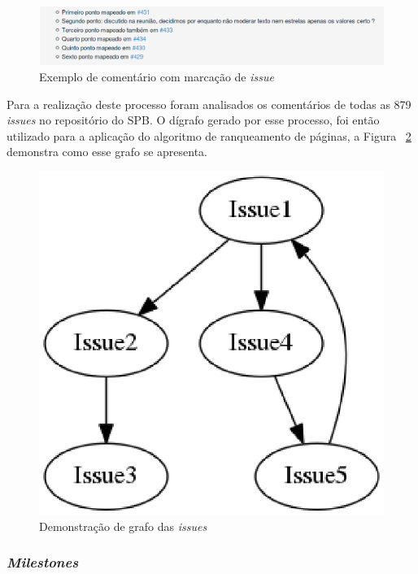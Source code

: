\begin{figure}[!h]
    \centering
        \includegraphics[keepaspectratio=true,scale=0.7]{figuras/issue-comment.eps}
    \caption{Exemplo de comentário com marcação de \textit{issue}}
    \label{fig:issue-comment}
\end{figure}

Para a realização deste processo foram analisados os comentários de todas as 879 \textit{issues} no repositório do SPB. O dígrafo gerado por esse processo, foi então utilizado para a aplicação do algoritmo de ranqueamento de páginas, a Figura ~\ref{fig:issue-graph} demonstra como esse grafo se apresenta.

\begin{figure}[!h]
    \centering
        \includegraphics[keepaspectratio=true,scale=0.5]{figuras/issue-graph.eps}
    \caption{Demonstração de grafo das \textit{issues}}
    \label{fig:issue-graph}
\end{figure}


\subsubsection{\textit{Milestones}}
\label{est:ran:mil}

